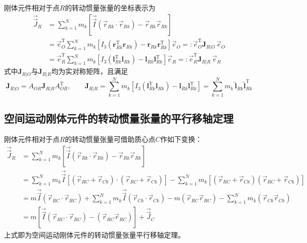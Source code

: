 刚体元件相对于点$R$的转动惯量张量的坐标表示为
\begin{align}
\vec{\vec{J}}_R &= \sum_{k=1}^{N} m_k[\vec{\vec{I}}(\vec{r}_{Rk}\cdot\vec{r}_{Rk}) - \vec{r}_{Rk}\vec{r}_{Rk}] \nonumber\\
&= \vec{e}_O^{\mathrm{T}}\sum_{k=1}^{N} m_k[I_3(\boldsymbol{r}_{Rk}^{\mathrm{T}}\boldsymbol{r}_{Rk}) - \boldsymbol{r}_{Rk}\boldsymbol{r}_{Rk}^{\mathrm{T}}]\vec{e}_O
   =: \vec{e}_O^{\mathrm{T}}\boldsymbol{J}_{R|O}\,\vec{e}_O \nonumber\\
&= \vec{e}_R^{\mathrm{T}}\sum_{k=1}^{N} m_k[I_3(\boldsymbol{l}_{Rk}^{\mathrm{T}}\boldsymbol{l}_{Rk}) - \boldsymbol{l}_{Rk}\boldsymbol{l}_{Rk}^{\mathrm{T}}]\vec{e}_R
   =: \vec{e}_R^{\mathrm{T}}\boldsymbol{J}_{R|R}\,\vec{e}_R
\label{eq:8.12}
\end{align}
式中$\boldsymbol{J}_{R|O}$与$\boldsymbol{J}_{R|R}$均为实对称矩阵，且满足
\begin{equation}
\boldsymbol{J}_{R|O} = A_{OR}\boldsymbol{J}_{R|R}A_{OR}^{\mathrm{T}}, \qquad
\boldsymbol{J}_{R|R} = \sum_{k=1}^{N} m_k[I_3(\boldsymbol{l}_{Rk}^{\mathrm{T}}\boldsymbol{l}_{Rk}) - \boldsymbol{l}_{Rk}\boldsymbol{l}_{Rk}^{\mathrm{T}}]
= \sum_{k=1}^{N} m_k\,\tilde{\boldsymbol{l}}_{Rk}\tilde{\boldsymbol{l}}_{Rk}^{\mathrm{T}}
\label{eq:8.13}
\end{equation}

\subsection*{空间运动刚体元件的转动惯量张量的平行移轴定理}

刚体元件相对于点$R$的转动惯量张量可借助质心点$C$作如下变换：
\begin{align}
\vec{\vec{J}}_R &= \sum_{k=1}^{N} m_k[\vec{\vec{I}}(\vec{r}_{Rk}\cdot\vec{r}_{Rk}) - \vec{r}_{Rk}\vec{r}_{Rk}] \nonumber\\
&= \sum_{k=1}^{N} m_k\vec{\vec{I}}[(\vec{r}_{RC} + \vec{r}_{Ck})\cdot(\vec{r}_{RC} + \vec{r}_{Ck})]
   - \sum_{k=1}^{N} m_k[(\vec{r}_{RC} + \vec{r}_{Ck})(\vec{r}_{RC} + \vec{r}_{Ck})] \nonumber\\
&= m\vec{\vec{I}}(\vec{r}_{RC}\cdot\vec{r}_{RC}) + \sum_{k=1}^{N} m_k\vec{\vec{I}}(\vec{r}_{Ck}\cdot\vec{r}_{Ck})
   - m(\vec{r}_{RC}\vec{r}_{RC}) - \sum_{k=1}^{N} m_k(\vec{r}_{Ck}\vec{r}_{Ck}) \nonumber\\
&= m[\vec{\vec{I}}(\vec{r}_{RC}\cdot\vec{r}_{RC}) - (\vec{r}_{RC}\vec{r}_{RC})] + \vec{\vec{J}}_C
\label{eq:8.14}
\end{align}
上式即为空间运动刚体元件的转动惯量张量平行移轴定理。

